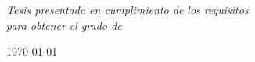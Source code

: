 \documentclass[
12pt, %
spanish, %
singlespacing, %
headsepline, %
]{MastersDoctoralThesis} %
\theoremstyle{plain}
\theoremstyle{definition}
\begin{document}
\begin{titlepage}
\begin{center}
\vfill

\large \textit{Tesis presentada en cumplimiento de los requisitos \\ para obtener el grado de \degreename}\\[0.3cm] %
 
\vfill


\today
\\[4cm] %
 

\end{center}
\end{titlepage}

%

 
 




\end{document}
